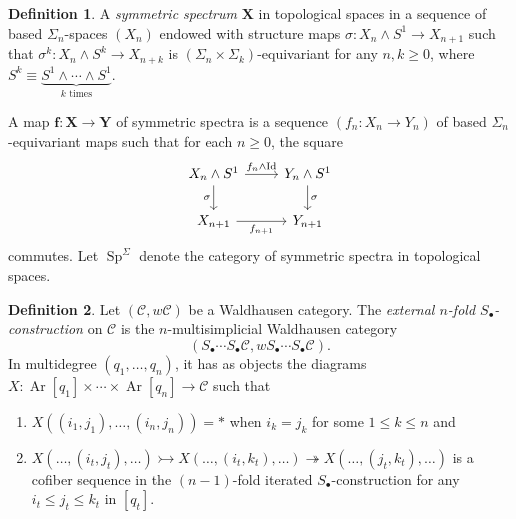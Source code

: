 \documentclass[10pt,letterpaper,cm]{nupset}
\theoremstyle{definition}
\newtheorem{definition}{Definition}[section]
\theoremstyle{theorem}
\theoremstyle{remark}
\newcommand{\X}{\mathbf X}
\newcommand{\1}{\mathbf{1}}
\renewcommand{\c}{\mathscr{C}}
\newcommand{\0}{\vec 0}
\DeclareMathOperator{\id}{Id}
\DeclareMathOperator{\Ar}{Ar}
\DeclareMathOperator{\Sp}{Sp}
\begin{document}
\begin{definition}
 A \textit{symmetric spectrum} $\X$ in topological spaces in a sequence of based $\Sigma_n$-spaces $\left(X_n\right)$ endowed with structure maps $\sigma : X_n \land S^1 \to X_{n+1}$ such that $\sigma^k : X_n \land S^k \to X_{n+k}$ is $\left(\Sigma_{n}\times \Sigma_{k}\right)$-equivariant for any $n,k\geq 0$, where $S^k \equiv \underbrace{S^1 \land \cdots \land S^1}_{k\text{ times}}$. 
 
 \smallskip
 
 A map $\mathbf{f} : \X \to \mathbf{Y}$ of symmetric spectra is a sequence $\left(f_n : X_n \to Y_n\right)$ of based $\Sigma_n$-equivariant maps such that for each $n\geq 0$, the square
\[
\begin{tikzcd}
X_n \land S^1 \arrow[d, "\sigma"'] \arrow[r, "f_n \land \id"] & Y_n \land S^1 \arrow[d, "\sigma"] \\
X_{n+1} \arrow[r, "f_{n+1}"'] & Y_{n+1}
\end{tikzcd}
\]
commutes. Let $\Sp^{\Sigma}$ denote the category of symmetric spectra in topological spaces.
\end{definition}

\begin{definition}
Let $\left(\c,w{\c}\right)$ be a Waldhausen category. The \textit{external $n$-fold $S_{\bullet}$-construction} on $\c$ is the $n$-multisimplicial Waldhausen category $$\left(S_{\bullet}\cdots S_{\bullet}\c, wS_{\bullet} \cdots S_{\bullet} \c\right).$$ In multidegree $\left(q_1, \ldots, q_n\right)$, it has as objects the diagrams  $X: \Ar[q_1] \times \cdots \times \Ar[q_n] \to \c$ such that
\begin{enumerate}[label=(\roman*)]
\item $X((i_1, j_1), \ldots, (i_n, j_n)) = \ast$ when $i_k = j_k$ for some $1\leq k \leq n$ and
\item $X(\ldots, (i_t, j_t), \ldots) \rightarrowtail X(\ldots, (i_t, k_t), \ldots) \twoheadrightarrow X(\ldots, (j_t, k_t), \ldots)$ is a cofiber sequence  in the $\left(n-1\right)$-fold iterated $S_{\bullet}$-construction for any $i_t \leq j_t \leq k_t$ in $\left[q_t\right]$.
\end{enumerate}
\end{definition}
\end{document}
